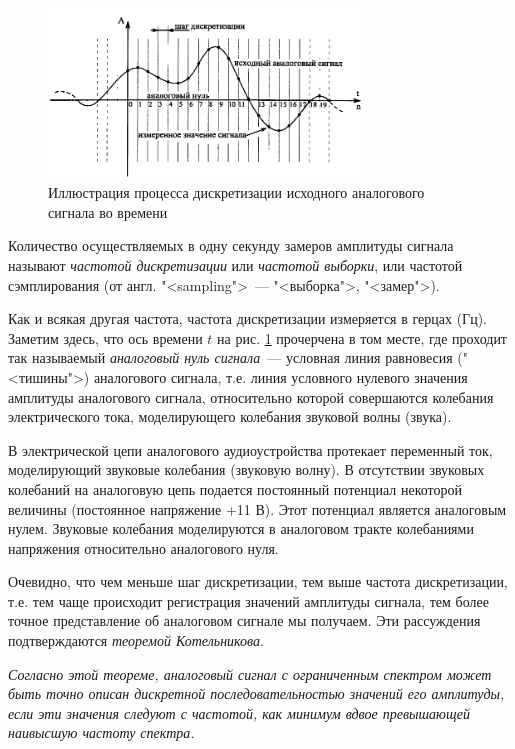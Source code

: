 \documentclass[oneside, final, 14pt]{extreport}
\begin{document}
\begin{figure}[h]
\centering
\includegraphics[width=0.75\textwidth]{pic-digital-01}
\caption{Иллюстрация процесса дискретизации исходного аналогового сигнала во времени}
\label{pic-digital-01}
\end{figure}

Количество осуществляемых в одну секунду замеров амплитуды сигнала называют \textit{частотой дискретизации} или \textit{частотой выборки}, или частотой сэмплирования (от англ. "<sampling">~--- "<выборка">, "<замер">). 

Как и всякая другая частота, частота дискретизации измеряется в герцах (Гц). Заметим здесь, что ось времени $t$ на рис. \ref{pic-digital-01} прочерчена в том месте, где проходит так называемый \textit{аналоговый нуль сигнала}~--- условная линия равновесия ("<тишины">) аналогового сигнала, т.е. линия условного нулевого значения амплитуды
аналогового сигнала, относительно которой совершаются колебания электрического тока, моделирующего колебания звуковой волны (звука).

В электрической цепи аналогового аудиоустройства протекает переменный ток, моделирующий звуковые колебания (звуковую волну). В отсутствии звуковых колебаний на аналоговую цепь подается постоянный потенциал некоторой величины (постоянное напряжение +11 В). Этот потенциал является аналоговым нулем. Звуковые колебания моделируются в аналоговом тракте колебаниями напряжения относительно аналогового нуля.

Очевидно, что чем меньше шаг дискретизации, тем выше частота дискретизации, т.е. тем чаще происходит регистрация значений амплитуды сигнала, тем более точное представление об аналоговом сигнале мы получаем. Эти рассуждения
подтверждаются \textit{теоремой Котельникова}. 

\emph{Согласно этой теореме, аналоговый сигнал с ограниченным спектром может быть точно описан дискретной последовательностью значений его амплитуды, если эти значения следуют с частотой, как минимум вдвое превышающей наивысшую частоту спектра.} 
\end{document}
